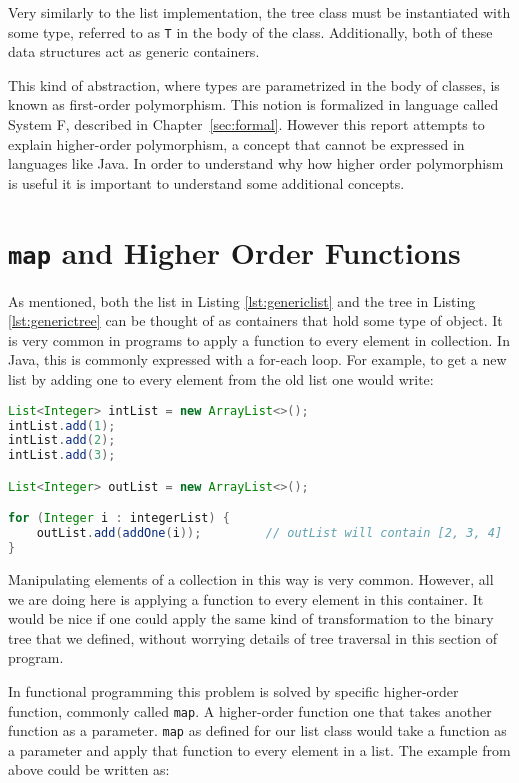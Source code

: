 Very similarly to the list implementation, the tree class must be instantiated
with some type, referred to as \lstinline{T} in the body of the class.
Additionally, both of these data structures act as generic containers.

This kind of abstraction, where types are parametrized in the body of classes,
is known as first-order polymorphism. This notion is formalized in language
called System F, described in Chapter~\ref{sec:formal}. However this report
attempts to explain higher-order polymorphism, a concept that cannot be
expressed in languages like Java. In order to understand why how higher order
polymorphism is useful it is important to understand some additional concepts.

\section{\lstinline{map} and Higher Order Functions}\label{sec:hof}
As mentioned, both the list in Listing \ref{lst:genericlist} and the tree in
Listing \ref{lst:generictree} can be thought of as containers that hold some
type of object. It is very common in programs to apply a function to every
element in collection. In Java, this is commonly expressed with a for-each
loop. For example, to get a new list by adding one to every element from the
old list one would write:

\begin{lstlisting}[nolol, language=Java, label={lst:forloop}]
List<Integer> intList = new ArrayList<>();
intList.add(1);
intList.add(2);
intList.add(3);

List<Integer> outList = new ArrayList<>();

for (Integer i : integerList) {
    outList.add(addOne(i));         // outList will contain [2, 3, 4]
}
\end{lstlisting}

Manipulating elements of a collection in this way is very common. However, all
we are doing here is applying a function to every element in this container.
It would be nice if one could apply the same kind of transformation to the
binary tree that we defined, without worrying details of tree traversal in this
section of program.

In functional programming this problem is solved by specific higher-order
function, commonly called \lstinline{map}.  A higher-order function one that
takes another function as a parameter. \lstinline{map} as defined for our list
class would take a function as a parameter and apply that function to every
element in a list. The example from above could be written as:

